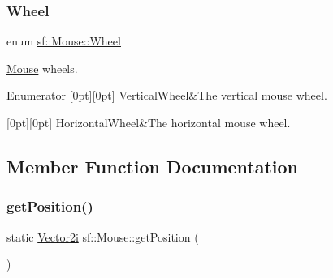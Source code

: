 \subsubsection{\texorpdfstring{Wheel}{Wheel}}
{\footnotesize\ttfamily enum \hyperlink{classsf_1_1_mouse_a60dd479a43f26f200e7957aa11803ff4}{sf\+::\+Mouse\+::\+Wheel}}



\hyperlink{classsf_1_1_mouse}{Mouse} wheels. 

\begin{DoxyEnumFields}{Enumerator}
[0pt][0pt]{}\mbox{\label{classsf_1_1_mouse_a60dd479a43f26f200e7957aa11803ff4abd571de908d2b2c4b9f165f29c678496}} 
Vertical\+Wheel&The vertical mouse wheel. \\
\hline

[0pt][0pt]{}\mbox{\label{classsf_1_1_mouse_a60dd479a43f26f200e7957aa11803ff4a785768d5e33c77de9fdcfdd02219f4e2}} 
Horizontal\+Wheel&The horizontal mouse wheel. \\
\hline

\end{DoxyEnumFields}


\subsection{Member Function Documentation}
\mbox{\label{classsf_1_1_mouse_ac368680f797b7f6e4f50b5b7928c1387}} 
\subsubsection{\texorpdfstring{get\+Position()}{getPosition()}\hspace{0.1cm}{\footnotesize\ttfamily [1/2]}}
{\footnotesize\ttfamily static \hyperlink{classsf_1_1_vector2}{Vector2i} sf\+::\+Mouse\+::get\+Position (\begin{DoxyParamCaption}{ }\end{DoxyParamCaption})\hspace{0.3cm}{\ttfamily [static]}}



